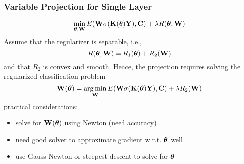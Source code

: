 \documentclass[12pt,fleqn]{beamer}
\begin{document}
\begin{frame}
	\frametitle{Variable Projection for Single Layer}
	
$$
\min_{{\boldsymbol \theta},{\bf W}} E({\bf W} \sigma({\bf K}({\boldsymbol \theta}){\bf Y} ), {\bf C}) + \lambda R({\boldsymbol \theta},{\bf W})
$$
Assume that the regularizer is separable, i.e.,
$$
 R({\boldsymbol \theta},{\bf W}) =   R_1({\boldsymbol \theta}) +  R_2({\bf W})
$$
and that $R_2$ is convex and smooth. Hence, the projection requires solving the regularized classification problem
$$
{\bf W}({\boldsymbol \theta}) = \operatorname*{arg\,min}_{{\bf W}} E({\bf W}\sigma({\bf K}({\boldsymbol \theta}){\bf Y}), {\bf C}) + \lambda R_2({\bf W})
$$
practical considerations:
\begin{itemize}
	\item solve for ${\bf W}({\boldsymbol \theta})$ using Newton (need accuracy)
	\item need good solver to approximate gradient w.r.t. ${\boldsymbol \theta}$  well
	\item use Gauss-Newton or steepest descent to solve for ${\boldsymbol \theta}$ 
\end{itemize}
\end{frame}
\end{document}
